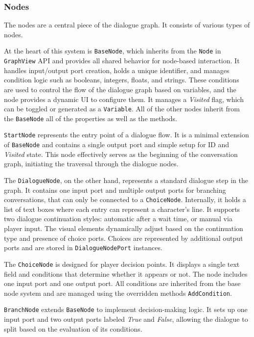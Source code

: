 \subsubsection{Nodes}
The nodes are a central piece of the dialogue graph. It consists of various types of nodes.

At the heart of this system is \verb|BaseNode|, which inherits from the \verb|Node| in \verb|GraphView| API and provides all shared behavior for node-based interaction. It handles input/output port creation, holds a unique identifier, and manages condition logic such as booleans, integers, floats, and strings. These conditions are used to control the flow of the dialogue graph based on variables, and the node provides a dynamic UI to configure them. It manages a \textit{Visited} flag, which can be toggled or generated as a \verb|Variable|. All of the other nodes inherit from the \verb|BaseNode| all of the properties as well as the methods.

\verb|StartNode| represents the entry point of a dialogue flow. It is a minimal extension of \verb|BaseNode| and contains a single output port and simple setup for ID and \textit{Visited} state. This node effectively serves as the beginning of the conversation graph, initiating the traversal through the dialogue nodes.

The \verb|DialogueNode|, on the other hand, represents a standard dialogue step in the graph. It contains one input port and multiple output ports for branching conversations, that can only be connected to a \verb|ChoiceNode|. Internally, it holds a list of text boxes where each entry can represent a character's line. It supports two dialogue continuation styles: automatic after a wait time, or manual via player input. The visual elements dynamically adjust based on the continuation type and presence of choice ports. Choices are represented by additional output ports and are stored in \verb|DialogueNodePort| instances.

 The \verb|ChoiceNode| is designed for player decision points. It displays a single text field and conditions that determine whether it appears or not. The node includes one input port and one output port. All conditions are inherited from the base node system and are managed using the overridden methods \verb|AddCondition|.

\verb|BranchNode| extends \verb|BaseNode| to implement decision-making logic. It sets up one input port and two output ports labeled \textit{True} and \textit{False}, allowing the dialogue to split based on the evaluation of its conditions. 

